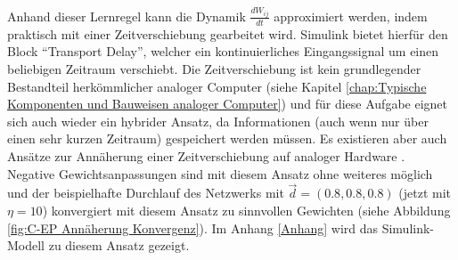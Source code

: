 Anhand dieser Lernregel kann die Dynamik \(\frac{dW_{ij}}{dt}\) approximiert werden, indem praktisch mit einer Zeitverschiebung gearbeitet wird. Simulink bietet hierfür den Block "`Transport Delay"', welcher ein kontinuierliches Eingangssignal um einen beliebigen Zeitraum verschiebt. Die Zeitverschiebung ist kein grundlegender Bestandteil herkömmlicher analoger Computer (siehe Kapitel \ref{chap:Typische Komponenten und Bauweisen analoger Computer}) und für diese Aufgabe eignet sich auch wieder ein hybrider Ansatz, da Informationen (auch wenn nur über einen sehr kurzen Zeitraum) gespeichert werden müssen. Es existieren aber auch Ansätze zur Annäherung einer Zeitverschiebung auf analoger Hardware \cite[vgl. S. 117 ff.]{Ulmann2022}. Negative Gewichtsanpassungen sind mit diesem Ansatz ohne weiteres möglich und der beispielhafte Durchlauf des Netzwerks mit \(\vec{d}=(0.8,0.8,0.8)\) (jetzt mit \(\eta=10\)) konvergiert mit diesem Ansatz zu sinnvollen Gewichten (siehe Abbildung \ref{fig:C-EP Annäherung Konvergenz}). Im Anhang \ref{Anhang} wird das Simulink-Modell zu diesem Ansatz gezeigt.

